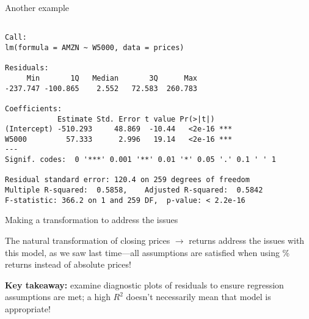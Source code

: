 \documentclass{beamer}\usepackage[]{graphicx}\usepackage[]{color}
\makeatletter
\newenvironment{kframe}{%
 \def\at@end@of@kframe{}%
 \ifinner\ifhmode%
  \def\at@end@of@kframe{\end{minipage}}%
  \begin{minipage}{\columnwidth}%
 \fi\fi%
 \def\FrameCommand##1{\hskip\@totalleftmargin \hskip-\fboxsep
 \colorbox{shadecolor}{##1}\hskip-\fboxsep
     \hskip-\linewidth \hskip-\@totalleftmargin \hskip\columnwidth}%
 \MakeFramed {\advance\hsize-\width
   \@totalleftmargin\z@ \linewidth\hsize
   \@setminipage}}%
 {\par\unskip\endMakeFramed%
 \at@end@of@kframe}
\newenvironment{knitrout}{}{} %
\makeatother
\begin{document}
\begin{darkframes}
\begin{frame}{Another example}
\begin{knitrout}


\end{knitrout}
    \end{frame}

    \begin{frame}[fragile]
      \fontsm
\begin{knitrout}
\begin{kframe}
\begin{verbatim}

Call:
lm(formula = AMZN ~ W5000, data = prices)

Residuals:
     Min       1Q   Median       3Q      Max 
-237.747 -100.865    2.552   72.583  260.783 

Coefficients:
            Estimate Std. Error t value Pr(>|t|)    
(Intercept) -510.293     48.869  -10.44   <2e-16 ***
W5000         57.333      2.996   19.14   <2e-16 ***
---
Signif. codes:  0 '***' 0.001 '**' 0.01 '*' 0.05 '.' 0.1 ' ' 1

Residual standard error: 120.4 on 259 degrees of freedom
Multiple R-squared:  0.5858,	Adjusted R-squared:  0.5842 
F-statistic: 366.2 on 1 and 259 DF,  p-value: < 2.2e-16
\end{verbatim}
\end{kframe}
\end{knitrout}
    \end{frame}

    \begin{frame}{Making a transformation to address the issues}
      \begin{center}
        The natural transformation of closing prices $\to$ returns address the issues with this model, as we saw last time---all assumptions are satisfied when using \% returns instead of absolute prices!

        \pause\bigskip
        \textbf{Key takeaway:} examine diagnostic plots of residuals to ensure regression assumptions are met; a high $R^2$ doesn't necessarily mean that model is appropriate!
      \end{center}
    \end{frame}


\end{darkframes}
\end{document}

